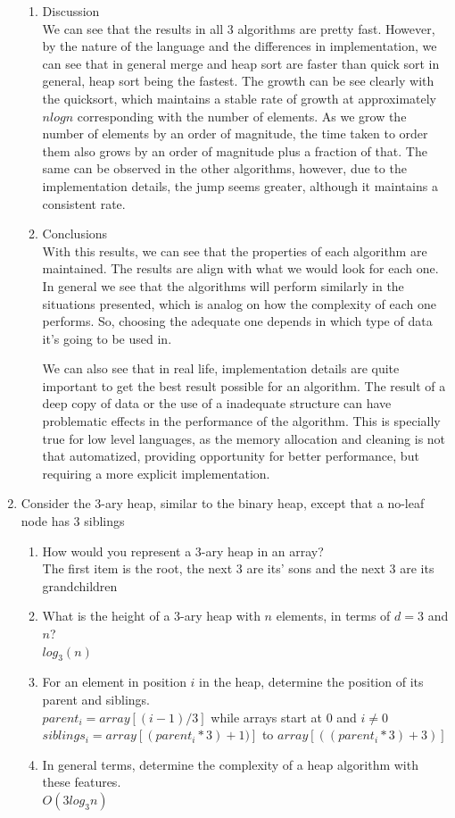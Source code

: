 \documentclass{article}
\begin{document}
\begin{enumerate}
\begin{enumerate}
        \item Discussion\\
        We can see that the results in all 3 algorithms are pretty fast. However, by the nature of the language and the differences in implementation, we can see that in general merge and heap sort are faster than quick sort in general, heap sort being the fastest. The growth can be see clearly with the quicksort, which maintains a stable rate of growth at approximately $nlogn$ corresponding with the number of elements. As we grow the number of elements by an order of magnitude, the time taken to order them also grows by an order of magnitude plus a fraction of that. The same can be observed in the other algorithms, however, due to the implementation details, the jump seems greater, although it maintains a consistent rate.

        \item Conclusions\\
        With this results, we can see that the properties of each algorithm are maintained. The results are align with what we would look for each one. In general we see that the algorithms will perform similarly in the situations presented, which is analog on how the complexity of each one performs. So, choosing the adequate one depends in which type of data it's going to be used in.

        We can also see that in real life, implementation details are quite important to get the best result possible for an algorithm. The result of a deep copy of data or the use of a inadequate structure can have problematic effects in the performance of the algorithm. This is specially true for low level languages, as the memory allocation and cleaning is not that automatized, providing opportunity for better performance, but requiring a more explicit implementation.

    \end{enumerate}


    \item Consider the 3-ary heap, similar to the binary heap, except that a no-leaf node has 3 siblings
    \begin{enumerate}
        \item How would you represent a 3-ary heap in an array?\\
        The first item is the root, the next 3 are its' sons and the next 3 are its grandchildren
        \item What is the height of a 3-ary heap with $n$ elements, in terms of $d = 3$ and $n$?\\
        $log_{3}(n)$
        \item For an element in position $i$ in the heap, determine the position of its parent and siblings.\\
        $parent_i = array[(i-1)/3]$ while arrays start at 0 and $i \neq 0$\\
        $siblings_i = array[(parent_i * 3)+1)]$ to $array[((parent_i * 3)+3)]$
        \item In general terms, determine the complexity of a heap algorithm with these features.\\
        $O(3log_3 n)$


\end{enumerate}
\end{enumerate}
\end{document}
